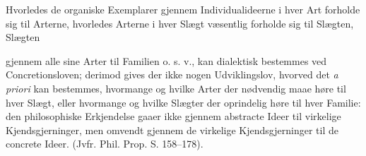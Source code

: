 \documentclass[12pt,a4paper]{book}
\begin{document}
Hvorledes de organiske Exemplarer gjennem Individualideerne i hver Art forholde
sig til Arterne, hvorledes Arterne i hver Slægt væsentlig forholde sig til
Slægten, Slægten

\setcounter{footnote}{0}
gjennem alle sine Arter til Familien o. s. v., kan dialektisk bestemmes ved
Concretionsloven; derimod gives der ikke nogen Udviklingslov, hvorved det
\textit{a priori} kan bestemmes, hvormange og hvilke Arter der nødvendig maae
høre til hver Slægt, eller hvormange og hvilke Slægter der oprindelig høre til
hver Familie: den philosophiske Erkjendelse gaaer ikke gjennem abstracte Ideer
til virkelige Kjendsgjerninger, men omvendt gjennem de virkelige
Kjendsgjerninger til de concrete Ideer. (Jvfr. Phil. Prop. S. 158--178).
\end{document}
